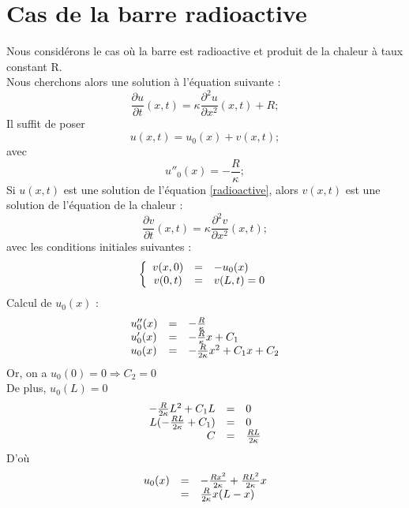 \documentclass[a4paper,12pt]{report}
\begin{document}
\section{Cas de la barre radioactive}
Nous consid\'erons le cas o\`u la barre est radioactive et produit de la chaleur \`a taux constant R.\\
Nous cherchons alors une solution \`a l'\'equation suivante :
\begin{equation}\label{radioactive}
\frac{\partial u}{\partial t}(x,t)=\kappa  \frac{\partial^2 u}{\partial x^2}(x,t) + R;
\end{equation}
Il suffit de poser
\begin{equation}
u(x,t)=u_{0}(x) + v(x,t);
\end{equation}
avec
\begin{equation}
u''_{0}(x)=-\frac{R}{\kappa};
\end{equation}
Si $u(x,t)$ est une solution de l'\'equation \eqref{radioactive}, alors $v(x,t)$ est une solution de l'\'equation de la chaleur :
\begin{equation}
\frac{\partial v}{\partial t}(x,t)=\kappa  \frac{\partial^2 v}{\partial x^2}(x,t);
\end{equation}
avec les conditions initiales suivantes :
\[ 
\left\{
  \begin{array}{c c l}
  v(x,0) &=& -u_{0}(x)\\
  v(0,t) &=& v(L,t) = 0\\
  \end{array}
\right.\]
Calcul de $u_{0}(x)$ :
\[ 
  \begin{array}{l c l}
  u''_{0}(x) &=& -\frac{R}{\kappa}\\
  u'_{0}(x) &=& -\frac{R}{\kappa}x + C_{1}\\
  u_{0}(x) &=& -\frac{R}{2\kappa}x^{2} + C_{1}x + C_{2}\\
  \end{array}
\]
Or, on a $u_{0}(0) = 0 \Rightarrow C_{2} = 0$\\
De plus, $u_{0}(L) = 0$
\[ 
  \begin{array}{r c l}
  -\frac{R}{2\kappa}L^{2} + C_{1}L &=& 0\\
  L(-\frac{RL}{2\kappa} + C_{1}) &=& 0\\
  C &=& \frac{RL}{2\kappa}\\
  \end{array}
\]
D'o\`u
\[ 
  \begin{array}{l c l}
  u_{0}(x) &=& -\frac{Rx^{2}}{2\kappa} + \frac{RL^{2}}{2\kappa}x\\
   &=& \frac{R}{2\kappa}x(L-x)\\
  \end{array}
\]
\end{document}
